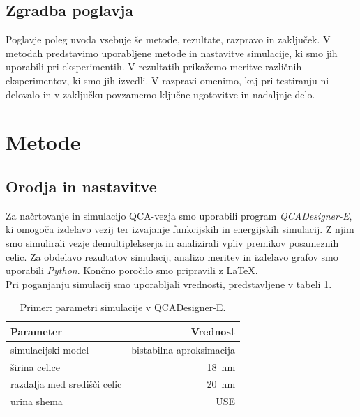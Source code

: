 
\subsection{Zgradba poglavja}
Poglavje poleg uvoda vsebuje še metode, rezultate, razpravo in zaključek. V metodah predstavimo uporabljene metode in nastavitve simulacije, ki smo jih uporabili pri eksperimentih. V rezultatih prikažemo meritve različnih eksperimentov, ki smo jih izvedli. V razpravi omenimo, kaj pri testiranju ni delovalo in v zaključku povzamemo ključne ugotovitve in nadaljnje delo.


\section{Metode}
\label{g27:sec:metode}

\subsection{Orodja in nastavitve}
\label{g27:sec:orodja}
Za načrtovanje in simulacijo QCA-vezja smo uporabili program \textit{QCADesigner-E}, ki omogoča izdelavo vezij ter izvajanje funkcijskih in energijskih simulacij. Z njim smo simulirali vezje demultiplekserja in analizirali vpliv premikov posameznih celic. Za obdelavo rezultatov simulacij, analizo meritev in izdelavo grafov smo uporabili \textit{Python}. Končno poročilo smo pripravili z \LaTeX.\\


\noindent
Pri poganjanju simulacij smo uporabljali vrednosti, predstavljene v tabeli \ref{g27:tab:parametri}.
\begin{table}[htbp]
\caption{Primer: parametri simulacije v QCADesigner-E.}
\label{g27:tab:parametri}
\centering
\begin{tabular}{lr}
\toprule
Parameter & Vrednost \\
\midrule
simulacijski model & bistabilna aproksimacija \\
širina celice & \SI{18}{\nano\metre} \\
razdalja med središči celic & \SI{20}{\nano\metre} \\
urina shema & USE \\
\bottomrule
\end{tabular}
\end{table}

